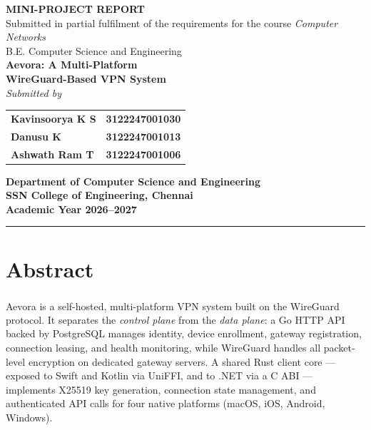 \documentclass[12pt,a4paper]{report}
\newcommand{\wireguard}{WireGuard\textsuperscript{\textregistered}}
\begin{document}

\begin{titlepage}
\begin{center}
\vspace*{0.5cm}
{\Large \textbf{MINI-PROJECT REPORT}}\\[0.3cm]
{\small Submitted in partial fulfilment of the requirements for the course \textit{Computer Networks}\\
B.E. Computer Science and Engineering}\\[1.2cm]
{\LARGE \textbf{Aevora: A Multi-Platform\\[4pt] WireGuard-Based VPN System}}\\[1.8cm]
\textit{Submitted by}\\[0.5cm]
\begin{tabular}{ll}
\textbf{Kavinsoorya K S} & \textbf{3122247001030}\\[4pt]
\textbf{Danusu K}        & \textbf{3122247001013}\\[4pt]
\textbf{Ashwath Ram T}   & \textbf{3122247001006}\\
\end{tabular}
\vfill
{\large \textbf{Department of Computer Science and Engineering}}\\[0.3cm]
{\large \textbf{SSN College of Engineering, Chennai}}\\[0.3cm]
{\large \textbf{Academic Year 2026--2027}}\\[0.8cm]
\rule{0.55\linewidth}{0.4pt}
\end{center}
\end{titlepage}

\chapter*{Abstract}

Aevora is a self-hosted, multi-platform VPN system built on the \wireguard{} protocol. It separates the \emph{control plane} from the \emph{data plane}: a Go HTTP API backed by PostgreSQL manages identity, device enrollment, gateway registration, connection leasing, and health monitoring, while WireGuard handles all packet-level encryption on dedicated gateway servers. A shared Rust client core — exposed to Swift and Kotlin via UniFFI, and to .NET via a C ABI — implements X25519 key generation, connection state management, and authenticated API calls for four native platforms (macOS, iOS, Android, Windows).
\end{document}
